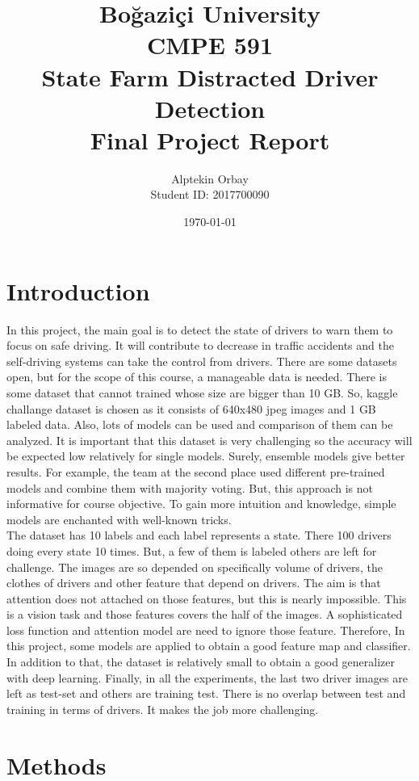 \documentclass[12pt, letterpaper]{article}
\title{ Bo\u{g}azi\c{c}i University\\CMPE 591  \\
	State Farm Distracted Driver Detection						\\
    Final Project Report
}
\author{Alptekin Orbay \\ Student ID: 2017700090}
\date{\today}
\begin{document}
\begin{titlepage}
  \maketitle
\end{titlepage}
\newpage
\tableofcontents
\newpage
\section{Introduction}
	In this project, the main goal is to detect the state of drivers to warn them to focus on safe driving. It will contribute to decrease in traffic accidents and the self-driving systems can take the control from drivers. There are some datasets open, but for the scope of this course, a manageable data is needed. There is some dataset that cannot trained whose size are bigger than 10 GB. So, kaggle challange dataset is chosen as it consists of 640x480 jpeg images and 1 GB labeled data. Also, lots of models can be used and comparison of them can be analyzed. It is important that this dataset is very challenging so the accuracy will be expected low relatively for single models. Surely, ensemble models give better results. For example, the team at the second place used different pre-trained models and combine them with majority voting. But, this approach is not informative for course objective. To gain more intuition and knowledge, simple models are enchanted with well-known tricks.\\
		The dataset has 10 labels and each label represents a state. There 100 drivers doing every state 10 times. But, a few of them is labeled others are left for challenge. The images are so depended on specifically 
volume of drivers, the clothes of drivers and other feature that depend on drivers. The aim is that attention does not attached on those features, but this is nearly impossible. This is a vision task and those features covers the half of the images. A sophisticated loss function and attention model are need to ignore those feature. Therefore, In this project, some models are applied to obtain a good feature map and classifier. In addition to that, the dataset is relatively small to obtain a good generalizer with deep learning. Finally, in all the experiments, the last two driver images are left as test-set and others are training test. There is no overlap between test and training in terms of drivers. It makes the job more challenging.
\section{Methods}
\end{document}
